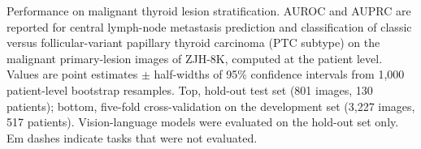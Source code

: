 \begin{table}[p]
\centering
\begin{threeparttable}

\caption{Performance on malignant thyroid lesion stratification. AUROC and AUPRC are reported for central lymph-node metastasis prediction and classification of classic versus follicular-variant papillary thyroid carcinoma (PTC subtype) on the malignant primary-lesion images of ZJH-8K, computed at the patient level. Values are point estimates $\pm$ half-widths of 95\% confidence intervals from 1{,}000 patient-level bootstrap resamples. Top, hold-out test set (801 images, 130 patients); bottom, five-fold cross-validation on the development set (3{,}227 images, 517 patients). Vision-language models were evaluated on the hold-out set only. Em dashes indicate tasks that were not evaluated.}
\label{tab:Malignant_images_tasks_performance}

\footnotesize
\setlength{\tabcolsep}{5.5pt}
\renewcommand{\arraystretch}{1.08}


\end{threeparttable}
\end{table}
